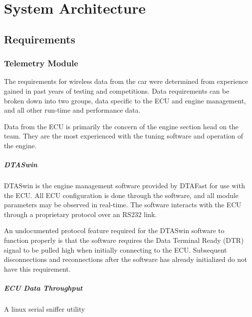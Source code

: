 %
%
%
%

\chapter{System Architecture}
\label{chap:architecture}

\section{Requirements}

\subsection{Telemetry Module}

The requirements for wireless data from the car were determined from experience gained in past years of testing and competitions. Data requirements can be broken down into two groups, data specific to the ECU and engine management, and all other run-time and performance data.

Data from the ECU is primarily the concern of the engine section head on the team. They are the most experienced with the tuning software and operation of the engine.

\paragraph*{DTASwin}

DTASwin is the engine management software provided by DTAFast for
use with the ECU. All ECU configuration is done through the software,
and all module parameters may be observed in real-time. The software
interacts with the ECU through a proprietary protocol over an RS232
link.

An undocumented protocol feature required for the DTASwin software
to function properly is that the software requires the Data Terminal
Ready (DTR) signal to be pulled high when initially connecting to
the ECU. Subsequent disconnections and reconnections after the software
has already initialized do not have this requirement.


\paragraph*{ECU Data Throughput}

A linux serial sniffer utility



